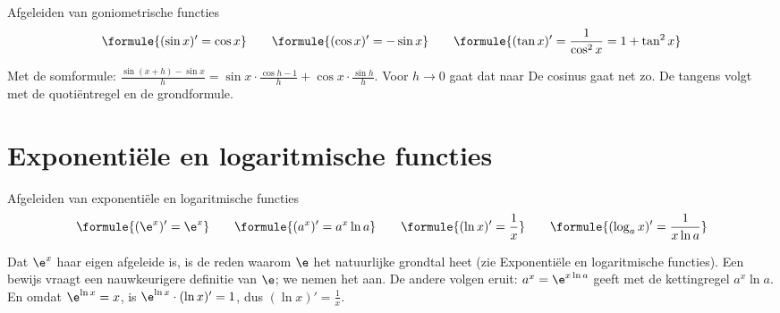 \begin{theorie}
\begin{stelling}{Afgeleiden van goniometrische functies}
\[\formule{(\sin x)' = \cos x} \qquad \formule{(\cos x)' = -\sin x} \qquad \formule{(\tan x)' = \frac{1}{\cos^2 x} = 1 + \tan^2 x}\]
\end{stelling}
\begin{bewijs}
Met de somformule: $\frac{\sin(x + h) - \sin x}{h} = \sin x \cdot \frac{\cos h - 1}{h} + \cos x \cdot \frac{\sin h}{h}$. Voor $h \to 0$ gaat dat naar
De cosinus gaat net zo. De tangens volgt met de quotiëntregel en de grondformule.
\end{bewijs}
\end{theorie}


\begin{oefeningen}


\end{oefeningen}

\section{Exponentiële en logaritmische functies}

\begin{theorie}
\begin{stelling}{Afgeleiden van exponentiële en logaritmische functies}
\[\formule{(\e^x)' = \e^x} \qquad \formule{(a^x)' = a^x \ln a} \qquad \formule{(\ln x)' = \frac1x} \qquad \formule{(\log_a x)' = \frac{1}{x \ln a}}\]
\end{stelling}
\end{theorie}

Dat $\e^x$ haar eigen afgeleide is, is de reden waarom $\e$ het natuurlijke grondtal heet (zie Exponentiële en logaritmische functies). Een bewijs vraagt een nauwkeurigere definitie van $\e$; we nemen het aan. De andere volgen eruit: $a^x = \e^{x\ln a}$ geeft met de kettingregel $a^x \ln a$. En omdat $\e^{\ln x} = x$, is $\e^{\ln x} \cdot (\ln x)' = 1$, dus $(\ln x)' = \frac{1}{x}$.

